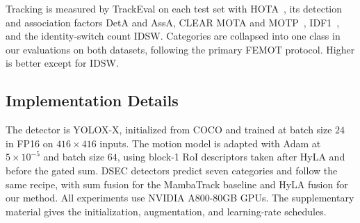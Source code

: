 \documentclass[10pt,twocolumn,letterpaper]{article}
\begin{document}
Tracking is measured by TrackEval on each test set with HOTA~\cite{luiten2021hota}, its detection and association factors DetA and AssA, CLEAR MOTA and MOTP~\cite{bernardin2008clear}, IDF1~\cite{ristani2016idf1}, and the identity-switch count IDSW. Categories are collapsed into one class in our evaluations on both datasets, following the primary FEMOT protocol. Higher is better except for IDSW.

\subsection{Implementation Details}

The detector is YOLOX-X, initialized from COCO and trained at batch size $24$ in FP16 on $416\times416$ inputs. The motion model is adapted with Adam at $5\times10^{-5}$ and batch size $64$, using block-1 RoI descriptors taken after HyLA and before the gated sum. DSEC detectors predict seven categories and follow the same recipe, with sum fusion for the MambaTrack baseline and HyLA fusion for our method. All experiments use NVIDIA A800-80GB GPUs. The supplementary material gives the initialization, augmentation, and learning-rate schedules. 
\end{document}
